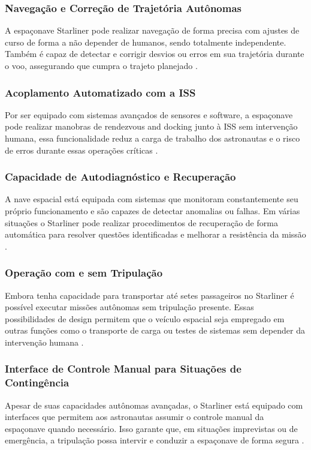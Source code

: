 \subsubsection{Navegação e Correção de Trajetória Autônomas}
A espaçonave Starliner pode realizar navegação de forma precisa com ajustes de curso de forma a não depender de humanos, sendo totalmente independente. Também é capaz de detectar e corrigir desvios ou erros em sua trajetória durante o voo, assegurando que cumpra o trajeto planejado \citep{boeing2024}.

\subsubsection{Acoplamento Automatizado com a ISS}
Por ser equipado com sistemas avançados de sensores e software, a espaçonave pode realizar manobras de rendezvous and docking junto à ISS sem intervenção humana, essa funcionalidade reduz a carga de trabalho dos astronautas e o risco de erros durante essas operações críticas \citep{boeing2024}.

\subsubsection{Capacidade de Autodiagnóstico e Recuperação}
A nave espacial está equipada com sistemas que monitoram constantemente seu próprio funcionamento e são capazes de detectar anomalias ou falhas. Em várias situações o Starliner pode realizar procedimentos de recuperação de forma automática para resolver questões identificadas e melhorar a resistência da missão \citep{boeing2024}.

\subsubsection{Operação com e sem Tripulação}
Embora tenha capacidade para transportar até setes passageiros no Starliner é possível executar missões autônomas sem tripulação presente. Essas possibilidades de design permitem que o veículo espacial seja empregado em outras funções como o transporte de carga ou testes de sistemas sem depender da intervenção humana \citep{boeing2024}.

\subsubsection{Interface de Controle Manual para Situações de Contingência}
Apesar de suas capacidades autônomas avançadas, o Starliner está equipado com interfaces que permitem aos astronautas assumir o controle manual da espaçonave quando necessário. Isso garante que, em situações imprevistas ou de emergência, a tripulação possa intervir e conduzir a espaçonave de forma segura \citep{boeing2024}.




